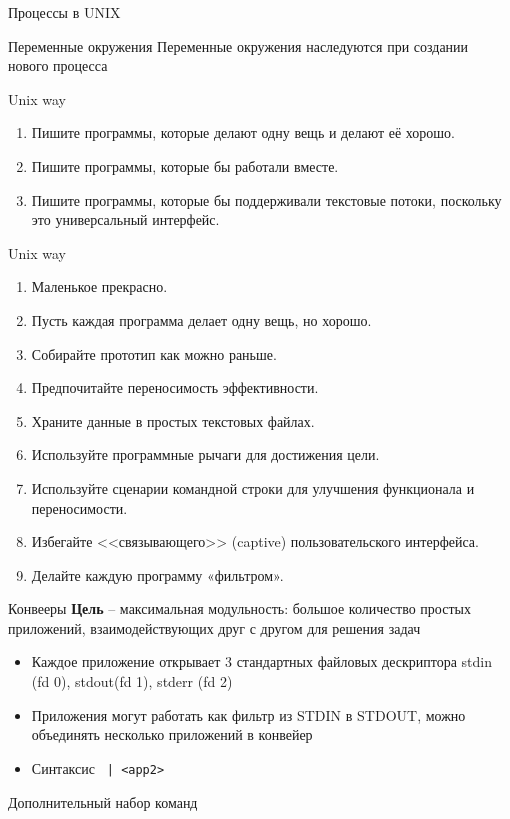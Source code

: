 \documentclass[ignorenonframetext, professionalfonts, hyperref={pdftex, unicode}]{beamer}
\begin{document}
\begin{frame}{Процессы в UNIX}
\begin{frame}{Переменные окружения}
Переменные окружения наследуются при создании нового процесса
\end{frame}
\begin{frame}{Unix way}
\begin{enumerate}
  \item Пишите программы, которые делают одну вещь и делают её хорошо.
  \item Пишите программы, которые бы работали вместе.
  \item Пишите программы, которые бы поддерживали текстовые потоки, поскольку это универсальный интерфейс. 
\end{enumerate}
\end{frame}
\begin{frame}{Unix way}
\begin{enumerate}
 \item   Маленькое прекрасно.
 \item   Пусть каждая программа делает одну вещь, но хорошо.
 \item   Собирайте прототип как можно раньше.
 \item   Предпочитайте переносимость эффективности.
 \item   Храните данные в простых текстовых файлах.
 \item   Используйте программные рычаги для достижения цели.
 \item   Используйте сценарии командной строки для улучшения функционала и переносимости.
 \item   Избегайте <<связывающего>> (captive) пользовательского интерфейса.
 \item   Делайте каждую программу «фильтром».
\end{enumerate}
\end{frame}
\begin{frame}{Конвееры}
  \textbf{Цель} -- максимальная модульность: большое количество простых приложений, взаимодействующих друг с другом для решения задач
  \begin{itemize}
    \item Каждое приложение открывает 3 стандартных файловых дескриптора stdin (fd 0), stdout(fd 1), stderr (fd 2)
    \item Приложения могут работать как фильтр из STDIN в STDOUT, можно объединять несколько приложений в конвейер
    \item Синтаксис {\tt <app1> | <app2>}
  \end{itemize}
\end{frame}
\begin{frame}{Дополнительный набор команд}

\end{frame}
\end{frame}
\end{document}
